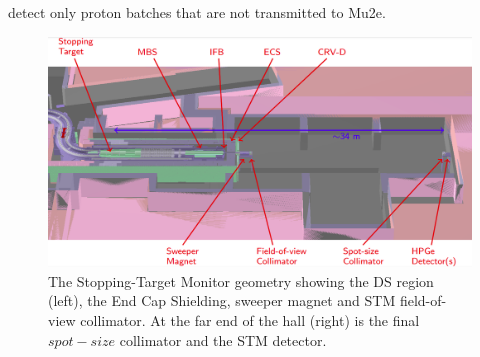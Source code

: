  detect only proton batches that are not transmitted to Mu2e.
\begin{figure}[!h]
\centering
\includegraphics[width =\textwidth]{figures/png/Screenshot_20240306_180910.png}
\caption{The Stopping-Target Monitor geometry showing the DS region (left), the End Cap Shielding, sweeper magnet and STM field-of-view collimator. At the far end of the hall (right) is the final $spot-size$ collimator and the STM detector.}
\label{fig:stm}
\end{figure}

